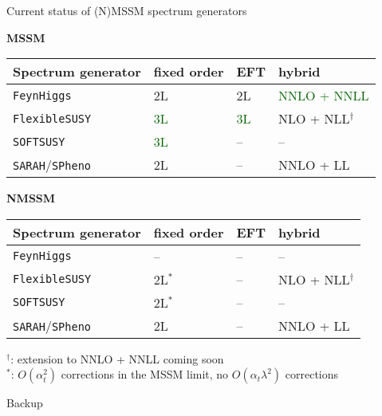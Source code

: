 \documentclass[hyperref={pdfpagelabels=false},ngerman]{beamer}
\renewcommand{\emph}{\textbf}
\newcommand{\FS}{\texttt{FlexibleSUSY}\xspace}
\newcommand{\FH}{\texttt{FeynHiggs}\xspace}
\newcommand{\SPheno}{\texttt{SPheno}\xspace}
\newcommand{\SARAH}{\texttt{SARAH}\xspace}
\newcommand{\SOFTSUSY}{\texttt{SOFTSUSY}\xspace}
\newcommand{\at}{\alpha_t}
\begin{document}
\begin{frame}{Current status of (N)MSSM spectrum generators}
  \begin{center}
    \emph{MSSM}\\[0.4em]
    \begin{tabular}{llll}
      \toprule
      Spectrum generator & fixed order & EFT & hybrid \\
      \midrule
      \FH                & 2L & 2L & \textcolor{darkgreen}{NNLO + NNLL} \\
      \FS                & \textcolor{darkgreen}{3L} & \textcolor{darkgreen}{3L} & NLO + NLL$^\dagger$ \\
      \SOFTSUSY          & \textcolor{darkgreen}{3L} & -- & -- \\
      \SARAH/\SPheno     & 2L & -- & NNLO + LL \\
      \bottomrule
    \end{tabular}
  \end{center}
  \begin{center}
    \emph{NMSSM}\\[0.4em]
    \begin{tabular}{llll}
      \toprule
      Spectrum generator & fixed order & EFT & hybrid \\
      \midrule
      \FH                & -- & -- & -- \\
      \FS                & 2L$^*$ & -- & NLO + NLL$^\dagger$ \\
      \SOFTSUSY          & 2L$^*$ & -- & -- \\
      \SARAH/\SPheno     & 2L & -- & NNLO + LL \\
      \bottomrule
    \end{tabular}
  \end{center}
  $^\dagger$: extension to NNLO + NNLL coming soon\\
  $^*$: $O(\at^2)$ corrections in the MSSM limit, no $O(\at\lambda^2)$ corrections
\end{frame}


\begin{frame}[noframenumbering]
  \begin{center}
    \Huge Backup
  \end{center}
\end{frame}

\end{document}
